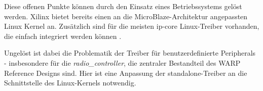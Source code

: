 \documentclass[letterpaper,11pt,ngerman]{article}
\begin{document}
\begin{onehalfspace}
Diese offenen Punkte können durch den Einsatz eines Betriebssystems
gelöst werden. Xilinx bietet bereits einen an die MicroBlaze-Architektur
angepassten Linux Kernel \autocite{xilinx-microblaze} an. Zusätzlich
sind für die meisten \ac{ip-core} Linux-Treiber vorhanden, die einfach
integriert werden können \autocite{xilinx-linux-drivers}.

Ungelöst ist dabei die Problematik der Treiber für benutzerdefinierte
Peripherals - insbesondere für die \emph{radio\_controller}, die
zentraler Bestandteil des WARP Reference Designs sind. Hier ist eine
Anpassung der standalone-Treiber an die Schnittstelle des Linux-Kernels
notwendig.


\newpage
\thispagestyle{empty}
\listoffigures
\listoftables
\newpage
\thispagestyle{empty}
\printbibliography
\end{onehalfspace}
\end{document}
